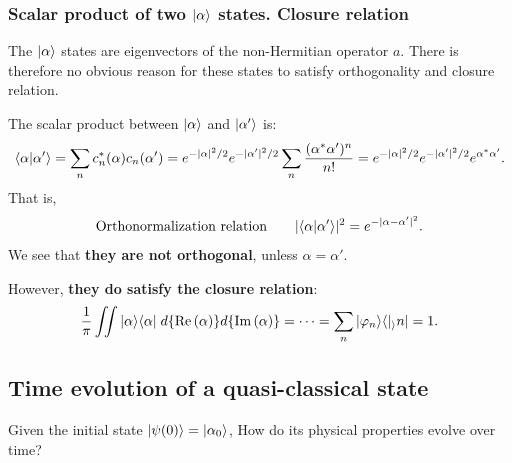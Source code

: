 \subsubsection{Scalar product of two $|\alpha\rangle$ states. Closure relation}
The $|\alpha\rangle$ states are eigenvectors of the non-Hermitian operator $a$. There is therefore no obvious reason for these states to satisfy orthogonality 
and closure relation.

The scalar product between $|\alpha\rangle$ and $|\alpha'\rangle$ is:
\begin{align*}
    \langle\alpha|\alpha'\rangle=\sum_n c_n^*(\alpha)c_n(\alpha')=e^{-|\alpha|^2/2}e^{-|\alpha'|^2/2}\sum_n\frac{(\alpha^*\alpha')^n}{n!}=e^{-|\alpha|^2/2}e^{-|\alpha'|^2/2}e^{\alpha^*\alpha'}.
\end{align*}
That is,
\begin{align}
    \text{Orthonormalization relation}\qquad|\langle\alpha|\alpha'\rangle|^2=e^{-|\alpha-\alpha'|^2}.
\end{align}
We see that \textbf{they are not orthogonal}, unless $\alpha=\alpha'$.

However, \textbf{they do satisfy the closure relation}:
\begin{align*}
    \frac{1}{\pi}\iint|\alpha\rangle\langle\alpha|\;d\{\text{Re}\left(\alpha\right)\}d\{\text{Im}\left(\alpha\right)\}=\cdots=\sum_n|\varphi_n\rangle\langle|_\rangle n|=1.
\end{align*}

\subsection{Time evolution of a quasi-classical state}
Given the initial state $|\psi(0)\rangle=|\alpha_0\rangle$, How do its physical properties evolve over time? 
%
